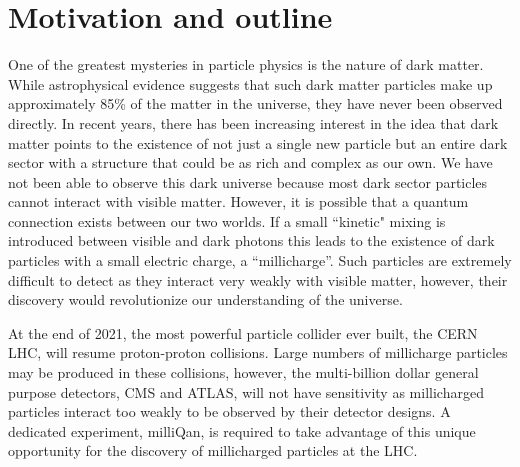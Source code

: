 \documentclass[11pt]{article}
\theoremstyle{plain} \numberwithin{equation}{section}
\theoremstyle{definition}
\begin{document}
\section*{Motivation and outline}
\noindent 

%

One of the greatest mysteries in particle physics is the nature of dark matter.
While astrophysical evidence suggests that such dark matter particles make up approximately 85\% of the matter
in the universe, they have never been observed directly. In recent years, 
there has been increasing interest in the idea that dark matter points to the 
existence of not just a single new particle but an entire dark sector 
with a structure that could be as rich and complex as our own. We have not been able to
observe this dark universe because most dark sector particles cannot interact with
visible matter. However, it is possible that a quantum connection exists between our two worlds. 
If a small ``kinetic" mixing is introduced between visible and dark photons this
leads to the existence of dark particles with a small electric charge, a ``millicharge''.
Such particles are extremely difficult to detect as they interact very weakly with
visible matter, however, their discovery would revolutionize our understanding
of the universe.

At the end of 2021, the most powerful particle collider ever built, the CERN LHC, 
will resume proton-proton collisions. Large numbers of millicharge particles may be 
produced in these collisions, however, the multi-billion dollar general purpose
detectors, CMS and ATLAS, will not have sensitivity as millicharged particles interact
too weakly to be observed by their detector designs. 
A dedicated experiment, milliQan, is required to take advantage of 
this unique opportunity for the discovery of millicharged particles at the LHC.
\end{document}
